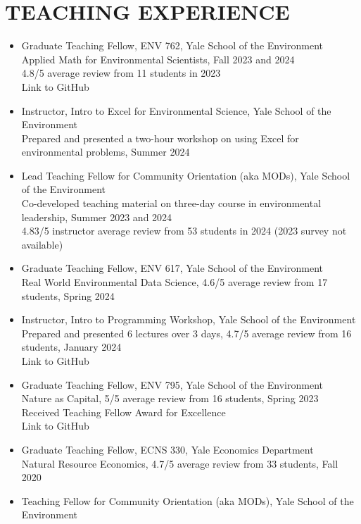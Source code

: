 \documentclass[11pt]{article}
\begin{document}
\section*{TEACHING EXPERIENCE}
\begin{itemize}[left=0pt]
    \item Graduate Teaching Fellow, ENV 762, Yale School of the Environment \\
    Applied Math for Environmental Scientists, Fall 2023 and 2024 \\
    4.8/5 average review from 11 students in 2023 \\
    Link to GitHub
    \item Instructor, Intro to Excel for Environmental Science, Yale School of the Environment \\
    Prepared and presented a two-hour workshop on using Excel for environmental problems, Summer 2024
    \item Lead Teaching Fellow for Community Orientation (aka MODs), Yale School of the Environment \\
    Co-developed teaching material on three-day course in environmental leadership, Summer 2023 and 2024 \\
    4.83/5 instructor average review from 53 students in 2024 (2023 survey not available)
    \item Graduate Teaching Fellow, ENV 617, Yale School of the Environment \\
    Real World Environmental Data Science, 4.6/5 average review from 17 students, Spring 2024
    \item Instructor, Intro to Programming Workshop, Yale School of the Environment \\
    Prepared and presented 6 lectures over 3 days, 4.7/5 average review from 16 students, January 2024 \\
    Link to GitHub
    \item Graduate Teaching Fellow, ENV 795, Yale School of the Environment \\
    Nature as Capital, 5/5 average review from 16 students, Spring 2023 \\
    Received Teaching Fellow Award for Excellence \\
    Link to GitHub
    \item Graduate Teaching Fellow, ECNS 330, Yale Economics Department \\
    Natural Resource Economics, 4.7/5 average review from 33 students, Fall 2020
    \item Teaching Fellow for Community Orientation (aka MODs), Yale School of the Environment \\

\end{itemize}
\end{document}
